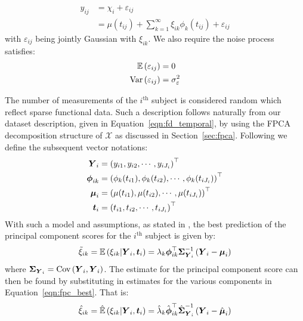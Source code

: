 \begin{align}
	y_{ij} &= \chi_{i} + \varepsilon_{ij} \\
	&= \mu(t_{ij}) + \sum_{k=1}^{\infty} \xi_{ik} \phi_k(t_{ij}) + \varepsilon_{ij} \label{eqn:fd_temporal_fpca}
\end{align}
with $\varepsilon_{ij}$ being jointly Gaussian with $\xi_{ik}$.
We also require the noise process satisfies:
\begin{align}
	\operatorname{\mathbb{E}}\left(\varepsilon_{ij}\right) &= 0 \\
	\text{Var}\left( \varepsilon_{ij} \right) &= \sigma_\varepsilon^2
\end{align}

The number of measurements of the $i^\text{th}$ subject is considered random which reflect sparse functional data.
Such a description follows naturally from our dataset description, given in Equation~\eqref{eqn:fd_temporal}, by using the FPCA decomposition structure of $\mathcal{X}$ as discussed in Section~\ref{sec:fpca}.
Following \citep{yao_functional_2005} we define the subsequent vector notations:
\begin{align}
	\bm{{Y}}_{i} &= \left(y_{i1}, y_{i2}, \cdots, y_{iJ_i}\right)^\top \label{eqn:yvec}\\
	\bm{{\phi}}_{ik} &= \left(\phi_{k}(t_{i1}), \phi_{k}(t_{i2}), \cdots, \phi_k(t_{iJ_i}) \right)^\top \label{eqn:phivec} \\
	\bm{{\mu}}_{i} &= \left(\mu(t_{i1}), \mu(t_{i2}), \cdots, \mu(t_{iJ_i})\right)^\top \label{eqn:muvec}\\
	\bm{{t}}_{i} &= \left( t_{i1}, t_{i2}, \cdots, t_{iJ_i} \right)^\top \label{eqn:tvec}
\end{align}
With such a model and assumptions, as stated in \citep{yao_functional_2005}, the best prediction of the principal component scores for the $i^\text{th}$  subject is given by:
\begin{equation}\label{eqn:fpc_best}
	\tilde{\xi}_{ik} = \operatorname{\mathbb{E}}\left(\xi_{ik} | \bm{{Y}}_{i}, \bm{{t}}_{i} \right) = \lambda_k \bm{{\phi}}_{ik}^{\top} \bm{{\Sigma}}_{\bm{{Y}}_{i}}^{-1} \left( \bm{{Y}}_{i} - \bm{{\mu}}_{i} \right)
\end{equation}
where $\bm{{\Sigma}}_{\bm{{Y}}_{i}} = \text{Cov}\left(\bm{{Y}}_{i}, \bm{{Y}}_{i} \right)$.
The estimate for the principal component score can then be found by substituting in estimates for the various components in Equation~\eqref{eqn:fpc_best}.
That is:
\begin{equation}\label{eqn:fpc_est}
	\hat{\xi}_{ik}= \hat{\operatorname{\mathbb{E}}}\left(\xi_{ik} | \bm{{Y}}_{i}, \bm{{t}}_{i} \right) = \hat\lambda_k \hat{\bm{{\phi}}}_{ik}^{\top} \hat{\bm{{\Sigma}}}_{\bm{{Y}}_{i}}^{-1} \left( \bm{{Y}}_{i} - \hat{\bm{{\mu}}}_{i} \right)
\end{equation}
